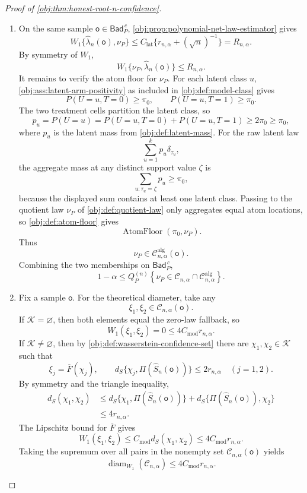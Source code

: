\documentclass[11pt]{article}
\begin{document}
\begin{proof}[Proof of \cref{obj:thm:honest-root-n-confidence}]
\begin{enumerate}
\item On the same sample \(\mathsf o\in\mathsf{Bad}_P^{\,c}\), \cref{obj:prop:polynomial-net-law-estimator} gives
\[
W_1\{\widehat\lambda_n(\mathsf o),\nu_P\}
\le
C_{\mathrm{lat}}\{r_{n,\alpha}+(\sqrt n)^{-1}\}
=
R_{n,\alpha}.
\]
By symmetry of \(W_1\),
\[
W_1\{\nu_P,\widehat\lambda_n(\mathsf o)\}
\le R_{n,\alpha}.
\]
It remains to verify the atom floor for \(\nu_P\).  For each latent class \(u\), \cref{obj:ass:latent-arm-positivity} as included in \cref{obj:def:model-class} gives
\[
P(U=u,T=0)\ge\pi_0,
\qquad
P(U=u,T=1)\ge\pi_0.
\]
The two treatment cells partition the latent class, so
\[
p_u=P(U=u)=P(U=u,T=0)+P(U=u,T=1)\ge2\pi_0\ge\pi_0,
\]
where \(p_u\) is the latent mass from \cref{obj:def:latent-mass}.  For the raw latent law
\[
\sum_{u=1}^{k}p_u\delta_{\tau_u},
\]
the aggregate mass at any distinct support value \(\zeta\) is
\[
\sum_{u:\tau_u=\zeta}p_u\ge\pi_0,
\]
because the displayed sum contains at least one latent class.  Passing to the quotient law \(\nu_P\) of \cref{obj:def:quotient-law} only aggregates equal atom locations, so \cref{obj:def:atom-floor} gives
\[
\operatorname{AtomFloor}(\pi_0,\nu_P).
\]
Thus
\[
\nu_P\in\mathcal C^{\mathrm{alg}}_{n,\alpha}(\mathsf o).
\]
Combining the two memberships on \(\mathsf{Bad}_P^{\,c}\),
\[
1-\alpha
\le
Q_P^{(n)}
\left\{
\nu_P\in
\mathcal C_{n,\alpha}\cap\mathcal C^{\mathrm{alg}}_{n,\alpha}
\right\}.
\]

\item Fix a sample \(\mathsf o\).  For the theoretical diameter, take any
\[
\xi_1,\xi_2\in\mathcal C_{n,\alpha}(\mathsf o).
\]
If \(\mathcal K=\varnothing\), then both elements equal the zero-law fallback, so
\[
W_1(\xi_1,\xi_2)=0\le4C_{\mathrm{mod}}r_{n,\alpha}.
\]
If \(\mathcal K\ne\varnothing\), then by \cref{obj:def:wasserstein-confidence-set} there are \(\chi_1,\chi_2\in\mathcal K\) such that
\[
\xi_j=\overline F(\chi_j),
\qquad
d_S\{\chi_j,\Pi(\widehat S_n(\mathsf o))\}\le2r_{n,\alpha}
\quad(j=1,2).
\]
By symmetry and the triangle inequality,
\[
\begin{aligned}
d_S(\chi_1,\chi_2)
&\le
d_S\{\chi_1,\Pi(\widehat S_n(\mathsf o))\}
+
d_S\{\Pi(\widehat S_n(\mathsf o)),\chi_2\}  \\
&\le4r_{n,\alpha}.
\end{aligned}
\]
The Lipschitz bound for \(\overline F\) gives
\[
W_1(\xi_1,\xi_2)
\le
C_{\mathrm{mod}}d_S(\chi_1,\chi_2)
\le
4C_{\mathrm{mod}}r_{n,\alpha}.
\]
Taking the supremum over all pairs in the nonempty set \(\mathcal C_{n,\alpha}(\mathsf o)\) yields
\[
\operatorname{diam}_{W_1}(\mathcal C_{n,\alpha})
\le
4C_{\mathrm{mod}}r_{n,\alpha}.
\]


\end{enumerate}
\end{proof}
\end{document}

